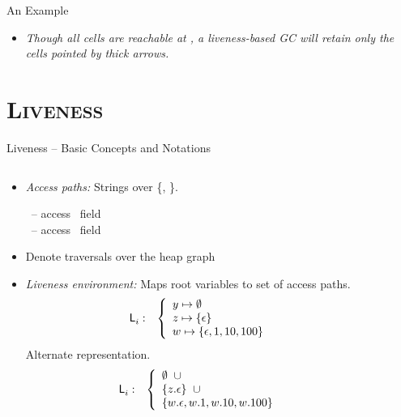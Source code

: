 \begin{frame}{An Example}
\bigskip
\begin{itemize}
\item<3->{\em   Though    all   cells   are    reachable   at
  ,  a liveness-based  GC  will retain
  only  the cells  pointed by  thick  arrows.}  
\end{itemize}
\end{frame}

\section{\scshape Liveness}
\begin{frame}{Liveness -- Basic Concepts and Notations}
\small
\begin{columns}
  \begin{column}[T]{0.75\textwidth}
    \begin{itemize}[<+->]\itemsep0.75em
    \item {\em Access paths:} Strings over \{\acar, \acdr\}.
      
      \hspace*{.25cm}   \acar\  -- access \CAR\ field \\
      \hspace*{.25cm}   \acdr\  -- access \CDR\ field 
    \item Denote traversals over the heap graph
    \item {\em Liveness environment:} 
          {Maps root variables    to set of access paths.
            \begin{eqnarray*}
              \mathsf{L}_{{i}}^{}&:&
              \left\{\begin{array}{l}
              y \mapsto \emptyset\\
              z \mapsto \{\epsilon\}\\
              w \mapsto \{\epsilon, 1, 10, 100\}
              \end{array}\right.
            \end{eqnarray*}
          }
              {Alternate representation.
                \begin{eqnarray*}
                  \mathsf{L}_{{i}}^{}&:&
                  \left\{\begin{array}{l}
                  \emptyset \;\; \cup  \\
                  \{z.\epsilon\} \;\; \cup\\
                  \{w.\epsilon, w.1, w.10, w.100\}
                  \end{array}\right.
                \end{eqnarray*} 
              }
    \end{itemize}
  \end{column}
  \begin{column}[T]{0.25\textwidth}
  \end{column}
\end{columns}


\end{frame}
